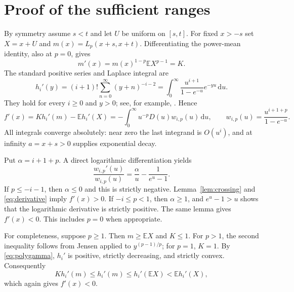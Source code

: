 \documentclass[11pt]{article}
\newcommand{\E}{\mathbb E}
\newcommand{\dd}{\,\mathrm d}
\begin{document}
\section*{Proof of the sufficient ranges}
By symmetry assume $s<t$ and let $U$ be uniform on $[s,t]$.
For fixed $x>-s$ set $X=x+U$ and $m(x)=L_p(x+s,x+t)$.
Differentiating the power-mean identity, also at $p=0$, gives
\begin{equation}\label{eq:mean-derivative}
m'(x)=m(x)^{1-p}\E X^{p-1}=K.
\end{equation}
The standard positive series and Laplace integral are
\begin{equation}\label{eq:polygamma}
h_i'(y)=(i+1)!\sum_{n=0}^\infty(y+n)^{-i-2}
 =\int_0^\infty\frac{u^{i+1}}{1-e^{-u}}e^{-yu}\dd u.
\end{equation}
They hold for every $i\ge0$ and $y>0$; see, for example,
\cite[equation (1.2)]{yang2016}. Hence
\begin{equation}\label{eq:derivative}
f'(x)=Kh_i'(m)-\E h_i'(X)
 =-\int_0^\infty u^{-p}D(u)w_{i,p}(u)\dd u,
\qquad
w_{i,p}(u)=\frac{u^{i+1+p}}{1-e^{-u}}.
\end{equation}
All integrals converge absolutely: near zero the last integrand is
$O(u^i)$, and at infinity $a=x+s>0$ supplies exponential decay.

Put $\alpha=i+1+p$. A direct logarithmic differentiation yields
\[
\frac{w_{i,p}'(u)}{w_{i,p}(u)}
 =\frac\alpha u-\frac1{e^u-1}.
\]
If $p\le-i-1$, then $\alpha\le0$ and this is strictly negative.
Lemma~\ref{lem:crossing} and \eqref{eq:derivative} imply $f'(x)>0$.
If $-i\le p<1$, then $\alpha\ge1$, and $e^u-1>u$ shows that
the logarithmic derivative is strictly positive. The same lemma gives
$f'(x)<0$. This includes $p=0$ when appropriate.

For completeness, suppose $p\ge1$. Then $m\ge\E X$ and $K\le1$.
For $p>1$, the second inequality follows from Jensen applied to
$y^{(p-1)/p}$; for $p=1$, $K=1$.
By \eqref{eq:polygamma}, $h_i'$ is positive, strictly decreasing,
and strictly convex. Consequently
\[
Kh_i'(m)\le h_i'(m)\le h_i'(\E X)<\E h_i'(X),
\]
which again gives $f'(x)<0$.
\end{document}
